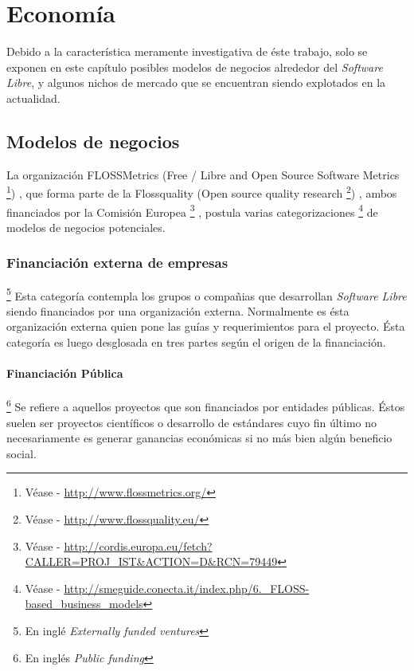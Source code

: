 \chapter{Econom\'ia}
%
Debido a la caracter\'istica meramente investigativa de \'este trabajo, solo
se exponen en este cap\'itulo posibles modelos de negocios alrededor del
\emph{Software Libre}, y algunos nichos de mercado que se encuentran siendo
explotados en la actualidad.\\

\section{Modelos de negocios}
La organizaci\'on FLOSSMetrics 
(Free / Libre and Open Source Software Metrics
\footnote{V\'ease - \url{http://www.flossmetrics.org/}})
, que forma parte de la Flossquality (Open source quality research
\footnote{V\'ease - \url{http://www.flossquality.eu/}})
, ambos financiados por la Comisi\'on Europea
\footnote{V\'ease -
\url{http://cordis.europa.eu/fetch?CALLER=PROJ_IST&ACTION=D&RCN=79449}}
, postula varias categorizaciones
\footnote{V\'ease -
\url{http://smeguide.conecta.it/index.php/6._FLOSS-based_business_models}} 
de modelos de negocios potenciales.


\subsection{Financiaci\'on externa de empresas}\footnote{En ingl\'e
\emph{Externally funded ventures}}
%
Esta categor\'ia contempla los grupos o compa\~nias que desarrollan
\emph{Software Libre} siendo financiados por una organizaci\'on externa.
Normalmente es \'esta organizaci\'on externa quien pone las gu\'ias y
requerimientos para el proyecto. \'Esta categor\'ia es luego desglosada en tres
partes seg\'un el origen de la financiaci\'on.

\subsubsection{Financiaci\'on P\'ublica}\footnote{En ingl\'es \emph{Public
funding}}
%
Se refiere a aquellos proyectos que son financiados por entidades p\'ublicas.
\'Estos suelen ser proyectos cient\'ificos o desarrollo de est\'andares cuyo
fin
\'ultimo no necesariamente es generar ganancias econ\'omicas si no m\'as bien
alg\'un beneficio social.

